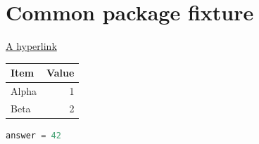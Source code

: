 \documentclass{article}
\begin{document}
\section*{Common package fixture}
\href{https://example.com}{A hyperlink}

\begin{longtable}{lr}
\toprule
Item & Value \\
\midrule
Alpha & 1 \\
Beta & 2 \\
\bottomrule
\end{longtable}

\begin{lstlisting}[language=Python]
answer = 42
\end{lstlisting}

\end{document}
